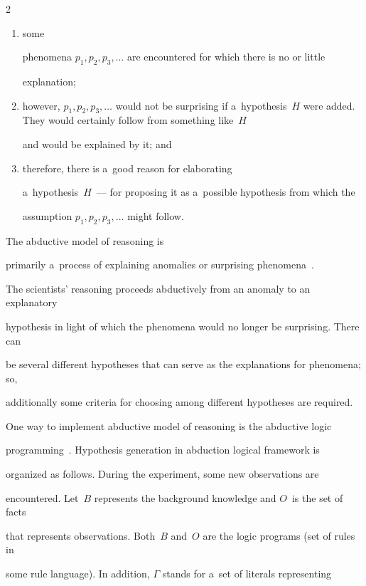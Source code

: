 \begin{multicols}{2}
\begin{enumerate}[(1)]


\item some


phenomena $p_1, p_2, p_3,\ldots$ are encountered for which there is no or little


explanation;


\item however,  $p_1, p_2, p_3,\ldots$ would not be surprising if a~hypothesis~$H$ were added. They would certainly follow from something like~$H$


and would be explained by it; and


\item therefore, there is a~good reason for elaborating


a~hypothesis~$H$~--- for proposing it as a~possible hypothesis from which the


assumption $p_1, p_2, p_3,\ldots$ might follow.


\end{enumerate}


 The abductive model of reasoning is


primarily a~process of explaining anomalies or surprising phenomena~\cite{16-kl}.


The scientists' reasoning proceeds abductively from an anomaly to an explanatory


hypothesis in light of which the phenomena would no longer be surprising. There can


be several different hypotheses that can serve as the explanations for phenomena; so,


additionally some criteria for choosing among different hypotheses are required.





  One way to implement abductive model of reasoning is the abductive logic


programming~\cite{17-kl}. Hypothesis generation in abduction logical framework is


organized as follows. During the experiment, some new observations are


encountered. Let~$B$ represents the background knowledge and $O$~is the set of facts


that represents observations. Both~$B$ and~$O$ are the logic programs (set of rules in


some rule language). In addition, $\Gamma$ stands for a~set of literals representing



\end{multicols}
